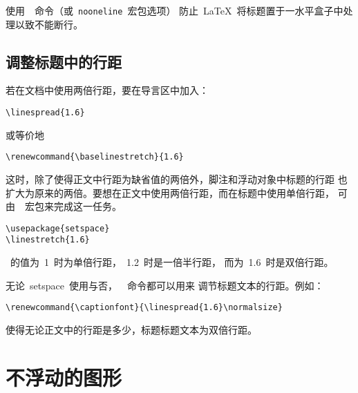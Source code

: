 使用~~命令（或~\texttt{nooneline}~宏包选项）
防止~\LaTeX{}~将标题置于一水平盒子中处理以致不能断行。

\clearpage

\subsection{调整标题中的行距}

若在文档中使用两倍行距，要在导言区中加入：
\begin{Verbatim}[xleftmargin=1cm]
\linespread{1.6}
\end{Verbatim}
或等价地
\begin{Verbatim}[xleftmargin=1cm]
\renewcommand{\baselinestretch}{1.6}
\end{Verbatim}
这时，除了使得正文中行距为缺省值的两倍外，脚注和浮动对象中标题的行距
也扩大为原来的两倍。要想在正文中使用两倍行距，而在标题中使用单倍行距，
可由~~宏包来完成这一任务。
\begin{Verbatim}[xleftmargin=1cm]
\usepackage{setspace} 
\linestretch{1.6}
\end{Verbatim}
~的值为~1~时为单倍行距，~1.2~时是一倍半行距，
而为~1.6~时是双倍行距。

无论~\textsf{setspace}~使用与否，~~命令都可以用来
调节标题文本的行距。例如：
\begin{Verbatim}[xleftmargin=1cm]
\renewcommand{\captionfont}{\linespread{1.6}\normalsize}
\end{Verbatim}
使得无论正文中的行距是多少，标题标题文本为双倍行距。

\section{不浮动的图形}\label{sec:nonfloat}

